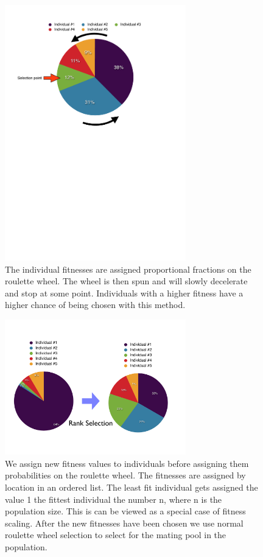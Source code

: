 \begin{figure}[tb] %
   \centering
   \includegraphics[width=0.7\textwidth]{chapter_ga/plots/rws_cropped.pdf} 
   \caption[Roulette Wheel Selection]{The individual fitnesses are assigned proportional fractions on the roulette wheel. The wheel is then spun and will slowly decelerate and stop at some point. Individuals with a higher fitness have a higher chance of being chosen with this method.}
   \label{fig:roulettewheel}
\end{figure}

\begin{figure}[tb] %
   \centering
   \includegraphics[width=0.7\textwidth]{chapter_ga/plots/rank_select.pdf} 
   \caption[Rank Selection with subsequent Roulette Wheel Selection]{We assign new fitness values to individuals before assigning them probabilities on the roulette wheel. The fitnesses are assigned by location in an ordered list. The least fit individual gets assigned the value 1 the fittest individual the number n, where n is the population size. This is can be viewed as a special case of fitness scaling. After the new fitnesses have been chosen we use normal roulette wheel selection to select for the mating pool in the population. }
   \label{fig:rankselection}
\end{figure}

